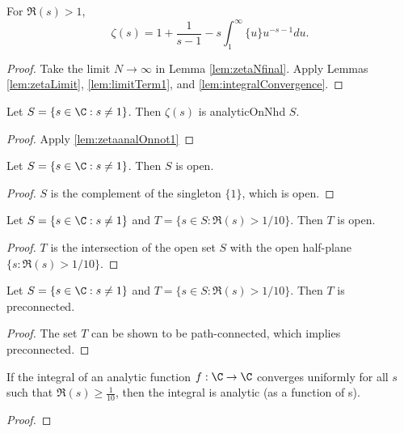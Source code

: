 \begin{lemma}\label{lem:zetaFormula}
\leanok
For $\Re(s)>1$,
\[ \zeta(s) = 1+\frac{1}{s-1} - s \int_1^\infty \{u\} u^{-s-1} du. \]
\end{lemma}
\begin{proof} \leanok
{}
Take the limit $N\to\infty$ in Lemma \ref{lem:zetaNfinal}. Apply Lemmas \ref{lem:zetaLimit}, \ref{lem:limitTerm1}, and \ref{lem:integralConvergence}.
\end{proof}

\begin{lemma}\label{lem:zetaanalS}
\leanok
Let $S=\{s\in \C : s\neq 1\}$. Then $\zeta(s)$ is analyticOnNhd $S$.
\end{lemma}
\begin{proof}
\leanok
{}
Apply \cref{lem:zetaanalOnnot1}
\end{proof}

\begin{lemma}[S open]\label{lem:S_isOpen}
\leanok
Let $S=\{s\in \C : s\neq 1\}$. Then $S$ is open.
\end{lemma}
\begin{proof}
\leanok
$S$ is the complement of the singleton $\{1\}$, which is open.
\end{proof}

\begin{lemma}[T open]\label{lem:T_isOpen}
\leanok
Let $S=\{s\in \C : s\neq 1\}$ and $T=\{s\in S : \Re(s)>1/10\}$. Then $T$ is open.
\end{lemma}
\begin{proof}
\leanok
$T$ is the intersection of the open set $S$ with the open half-plane $\{s : \Re(s) > 1/10\}$.
\end{proof}

\begin{lemma}[T connected]\label{lem:T_isPreconnected}
\leanok
Let $S=\{s\in \C : s\neq 1\}$ and $T=\{s\in S : \Re(s)>1/10\}$. Then $T$ is preconnected.
\end{lemma}
\begin{proof}
\leanok
The set $T$ can be shown to be path-connected, which implies preconnected.
\end{proof}

\begin{lemma} \label{lem:integralAnalytic}  \leanok
If the integral of an analytic function $f:\C\to\C$ converges uniformly for all $s$ such that $\Re(s) \ge \frac{1}{10}$, then the integral is analytic (as a function of s).
\end{lemma}
\begin{proof}
\leanok
\end{proof}

